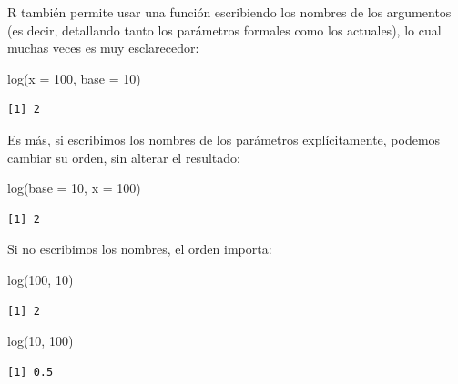 \documentclass[
]{book}
\newenvironment{Shaded}{\begin{snugshade}}{\end{snugshade}}
\newcommand{\AttributeTok}[1]{\textcolor[rgb]{0.77,0.63,0.00}{#1}}
\newcommand{\DecValTok}[1]{\textcolor[rgb]{0.00,0.00,0.81}{#1}}
\newcommand{\FunctionTok}[1]{\textcolor[rgb]{0.00,0.00,0.00}{#1}}
\newcommand{\NormalTok}[1]{#1}
\begin{document}
R también permite usar una función escribiendo los nombres de los argumentos (es decir, detallando tanto los parámetros formales como los actuales), lo cual muchas veces es muy esclarecedor:

\begin{Shaded}
\begin{Highlighting}[]
\FunctionTok{log}\NormalTok{(}\AttributeTok{x =} \DecValTok{100}\NormalTok{, }\AttributeTok{base =} \DecValTok{10}\NormalTok{)}
\end{Highlighting}
\end{Shaded}

\begin{verbatim}
[1] 2
\end{verbatim}

Es más, si escribimos los nombres de los parámetros explícitamente, podemos cambiar su orden, sin alterar el resultado:

\begin{Shaded}
\begin{Highlighting}[]
\FunctionTok{log}\NormalTok{(}\AttributeTok{base =} \DecValTok{10}\NormalTok{, }\AttributeTok{x =} \DecValTok{100}\NormalTok{)}
\end{Highlighting}
\end{Shaded}

\begin{verbatim}
[1] 2
\end{verbatim}

Si no escribimos los nombres, el orden importa:

\begin{Shaded}
\begin{Highlighting}[]
\FunctionTok{log}\NormalTok{(}\DecValTok{100}\NormalTok{, }\DecValTok{10}\NormalTok{)}
\end{Highlighting}
\end{Shaded}

\begin{verbatim}
[1] 2
\end{verbatim}

\begin{Shaded}
\begin{Highlighting}[]
\FunctionTok{log}\NormalTok{(}\DecValTok{10}\NormalTok{, }\DecValTok{100}\NormalTok{)}
\end{Highlighting}
\end{Shaded}

\begin{verbatim}
[1] 0.5
\end{verbatim}
\end{document}
